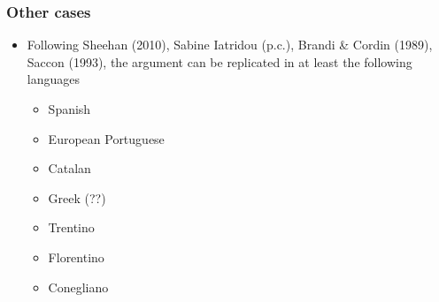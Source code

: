 \documentclass[letterpaper,10pt]{handout_nick}
\begin{document}
\subsubsection{Other cases}
\begin{itemize}
\item Following Sheehan (2010), Sabine Iatridou (p.c.), Brandi \& Cordin (1989), Saccon (1993), the argument can be replicated in at least the following languages
\begin{itemize}
\item Spanish
\item European Portuguese
\item Catalan
\item Greek (??)
\item Trentino
\item Florentino
\item Conegliano
\end{itemize}

\end{itemize}
\end{document}
